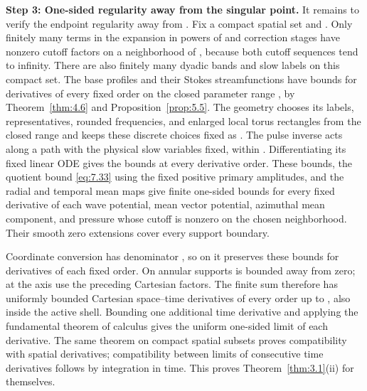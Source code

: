 \noindent\textbf{Step 3: One-sided regularity away from the singular point.} It remains to verify
the endpoint regularity away from . Fix a compact spatial set and
. Only finitely many terms in the expansion in powers of
 and correction stages have nonzero cutoff factors on a neighborhood
of , because both cutoff sequences tend to infinity. There are
also finitely many dyadic bands and slow labels on this compact set. The base profiles and their
Stokes streamfunctions have bounds for derivatives of every fixed order on the closed parameter
range , by Theorem~\ref{thm:4.6} and
Proposition~\ref{prop:5.5}. The geometry chooses its labels, representatives, rounded frequencies,
and enlarged local torus rectangles from the closed  range and
keeps these discrete choices fixed as . The pulse inverse acts along
a path with the physical slow variables fixed, within .
Differentiating its fixed linear ODE gives the bounds at every derivative order. These bounds, the
quotient bound \eqref{eq:7.33} using the fixed positive primary amplitudes, and the radial and
temporal mean maps give finite one-sided bounds for every fixed derivative of each wave potential,
mean
%
vector potential, azimuthal mean component, and pressure whose cutoff is nonzero on the chosen
neighborhood. Their smooth zero extensions cover every support boundary.

Coordinate conversion has denominator , so on
 it preserves these bounds for derivatives of each fixed order. On
annular supports  is bounded away from zero; at the axis use the preceding
Cartesian factors. The finite sum therefore has uniformly bounded Cartesian space--time derivatives
of every order up to , also inside the active shell. Bounding one
additional time derivative and applying the fundamental theorem of calculus gives the uniform
one-sided limit of each derivative. The same theorem on compact spatial subsets proves compatibility
with spatial derivatives; compatibility between limits of consecutive time derivatives follows by
integration in time. This proves Theorem~\ref{thm:3.1}\textup{(ii)} for
 themselves.

